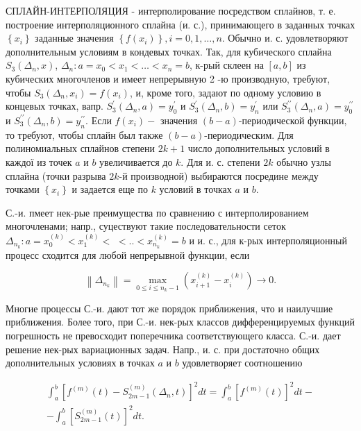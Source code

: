 \documentclass[10pt]{article}
\begin{document}
СПЛАЙН-ИНТЕРПОЛЯЦИЯ - интерполирование посредством сплайнов, т. е. построение интерполяционного сплайна (и. с.), принимающего в заданных точках $\left\{x_{i}\right\}$ заданные значения $\left\{f\left(x_{i}\right)\right\}, i=0,1, \ldots, n$. Обычно и. с. удовлетворяют дополнительным условиям в кондевых точках. Так, для кубического сплайна $S_{3}\left(\Delta_{n}, x\right)$, $\Delta_{n}: a=x_{0}<x_{1}<\ldots<x_{n}=b$, к-рый склеен на $[a, b]$ из кубических многочленов и имеет непрерывную 2 -ю производную, требуют, чтобы $S_{3}\left(\Delta_{n}, x_{i}\right)=f\left(x_{i}\right)$, и, кроме того, задают по одному условию в концевых точках, вапр. $S_{3}^{\prime}\left(\Delta_{n}, a\right)=y_{0}^{\prime}$ и $S_{3}^{\prime}\left(\Delta_{n}, b\right)=y_{n}^{\prime}$ или $S_{3}^{\prime \prime}\left(\Delta_{n}, a\right)=y_{0}^{\prime \prime}$ и $S_{3}^{\prime \prime}\left(\Delta_{n}, b\right)=y_{n}^{\prime \prime}$. Если $f\left(x_{i}\right)-$ значения $(b-a)$-периодической функции, то требуют, чтобы сплайн был также $(b-a)$-периодическим. Для полиномиальных сплайнов степени $2 k+1$ число дополнительных условий в каждої из точек $a$ и $b$ увеличивается до $k$. Для и. с. степени $2 k$ обычно узлы сплайна (точки разрыва $2 k$-й производной) выбираются посредине между точками $\left\{x_{i}\right\}$ и задается еще по $k$ условий в точках $a$ и $b$.



С.-и. пмеет нек-рые преимущества по сравнению с интерполированием многочленами; напр., суцествуют такие последовательности сеток $\Delta_{n_{k}}: a=x_{0}^{(k)}<x_{1}^{(k)}<$ $<. .<x_{n_{k}}^{(k)}=b$ и и. с., для к-рых интерполяционный процесс сходится для любой непрерывной функции, если



\[

\left\|\Delta_{n_{k}}\right\|=\max _{0 \leqslant i \leqslant n_{k}-1}\left(x_{i+1}^{(k)}-x_{i}^{(k)}\right) \longrightarrow 0 .

\]



Многие процессы С.-и. дают тот же порядок приближения, что и наилучшие приближения. Более того, при С.-и. нек-рых классов дифференцируемых функций погрешность не превосходит поперечника соответствующего класса. С.-и. дает решение нек-рых вариационных задач. Напр., и. с. при достаточно общих дополнительных условиях в точках $a$ и $b$ удовлетворяет соотношению



\[

\begin{gathered}

\int_{a}^{b}\left[f^{(m)}(t)-S_{2 m-1}^{(m)}\left(\Delta_{n}, t\right)\right]^{2} d t=\int_{a}^{b}\left[f^{(m)}(t)\right]^{2} d t- \\

-\int_{a}^{b}\left[S_{2 m-1}^{(m)}(t)\right]^{2} d t .

\end{gathered}

\]
\end{document}
